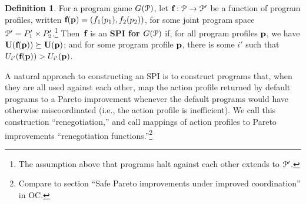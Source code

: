 \documentclass[sigconf]{aamas}
\theoremstyle{definition}
\newtheorem{definition}{Definition} %
\begin{document}
\begin{definition}
\label{def:progSPI}
For a program game $G(\mathcal{P})$,
let
$\textbf{f} : \mathcal{P} \to \mathcal{P}'$
be a function of program profiles,
written
$\textbf{f}(\textbf{p}) = (f_1(p_1), f_2(p_2))$,
for some joint program space $\mathcal{P}' = P_1' \times P_2'$.\footnote{The assumption above that programs halt 
against each
other extends to $\mathcal{P}'$.}
Then~$\textbf{f}$
is an \textbf{SPI for $G(\mathcal{P})$}
if,
for all
program profiles
$\textbf{p}$, we have
$\textbf{U}(\textbf{f}(\textbf{p})) \succeq \textbf{U}(\textbf{p})$;
and for
some
program profile
$\textbf{p}$,
there is some
$i'$ such that $U_{i'}(\textbf{f}(\textbf{p})) > U_{i'}(\textbf{p})$.
\end{definition}

A natural approach to constructing an SPI is to
construct programs
that,
when they are all used against each other, map 
the action profile returned by
default programs to a Pareto improvement
whenever the default programs would have otherwise miscoordinated (i.e.,
the action profile is inefficient).
We call this construction ``renegotiation,'' and call mappings of action
profiles to Pareto improvements
``renegotiation functions.''\footnote{Compare to  section ``Safe Pareto improvements under improved coordination'' in OC.}
\end{document}
